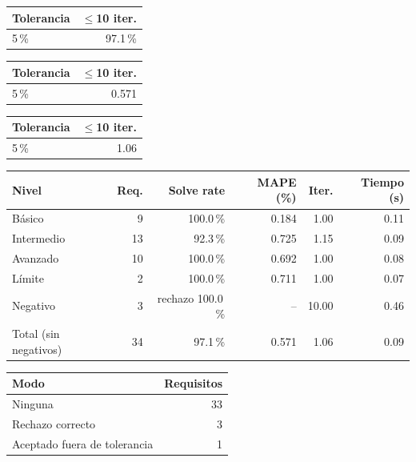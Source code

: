 \begin{tabular}{lr}
\toprule
\textbf{Tolerancia} & \textbf{$\leq$10 iter.} \\
\midrule
5\,\% & 97.1\,\% \\
\bottomrule
\end{tabular}

\begin{tabular}{lr}
\toprule
\textbf{Tolerancia} & \textbf{$\leq$10 iter.} \\
\midrule
5\,\% & 0.571 \\
\bottomrule
\end{tabular}

\begin{tabular}{lr}
\toprule
\textbf{Tolerancia} & \textbf{$\leq$10 iter.} \\
\midrule
5\,\% & 1.06 \\
\bottomrule
\end{tabular}

\begin{tabular}{lrrrrr}
\toprule
\textbf{Nivel} & \textbf{Req.} & \textbf{Solve rate} & \textbf{MAPE (\%)} & \textbf{Iter.} & \textbf{Tiempo (s)} \\
\midrule
Básico & 9 & 100.0\,\% & 0.184 & 1.00 & 0.11 \\
Intermedio & 13 & 92.3\,\% & 0.725 & 1.15 & 0.09 \\
Avanzado & 10 & 100.0\,\% & 0.692 & 1.00 & 0.08 \\
Límite & 2 & 100.0\,\% & 0.711 & 1.00 & 0.07 \\
Negativo & 3 & rechazo 100.0\,\% & -- & 10.00 & 0.46 \\
Total (sin negativos) & 34 & 97.1\,\% & 0.571 & 1.06 & 0.09 \\
\bottomrule
\end{tabular}

\begin{tabular}{lr}
\toprule
\textbf{Modo} & \textbf{Requisitos} \\
\midrule
Ninguna & 33 \\
Rechazo correcto & 3 \\
Aceptado fuera de tolerancia & 1 \\
\bottomrule
\end{tabular}

